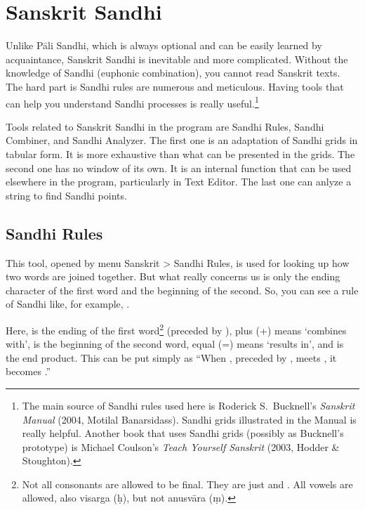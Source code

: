 \chapter{Sanskrit Sandhi}\label{chap:sktsandhi}

Unlike Pāli Sandhi, which is always optional and can be easily learned by acquaintance, Sanskrit Sandhi is inevitable and more complicated. Without the knowledge of Sandhi (euphonic combination), you cannot read Sanskrit texts. The hard part is Sandhi rules are numerous and meticulous. Having tools that can help you understand Sandhi processes is really useful.\footnote{The main source of Sandhi rules used here is Roderick S.\ Bucknell's \emph{Sanskrit Manual} (2004, Motilal Banarsidass). Sandhi grids illustrated in the Manual is really helpful. Another book that uses Sandhi grids (possibly as Bucknell's prototype) is Michael Coulson's \emph{Teach Yourself Sanskrit} (2003, Hodder \& Stoughton).}

Tools related to Sanskrit Sandhi in the program are Sandhi Rules, Sandhi Combiner, and Sandhi Analyzer. The first one is an adaptation of Sandhi grids in tabular form. It is more exhaustive than what can be presented in the grids. The second one has no window of its own. It is an internal function that can be used elsewhere in the program, particularly in Text Editor. The last one can anlyze a string to find Sandhi points.

\section{Sandhi Rules}

This tool, opened by menu Sanskrit > {\faSix {}} Sandhi Rules, is used for looking up how two words are joined together. But what really concerns us is only the ending character of the first word and the beginning of the second. So, you can see a rule of Sandhi like, for example, .

Here,  is the ending of the first word\footnote{Not all consonants are allowed to be final. They are just  and . All vowels are allowed, also visarga (ḥ), but not anusvāra (ṃ).} (preceded by ), plus (+) means `combines with',  is the beginning of the second word, equal (=) means `results in', and  is the end product. This can be put simply as ``When , preceded by , meets , it becomes .''


